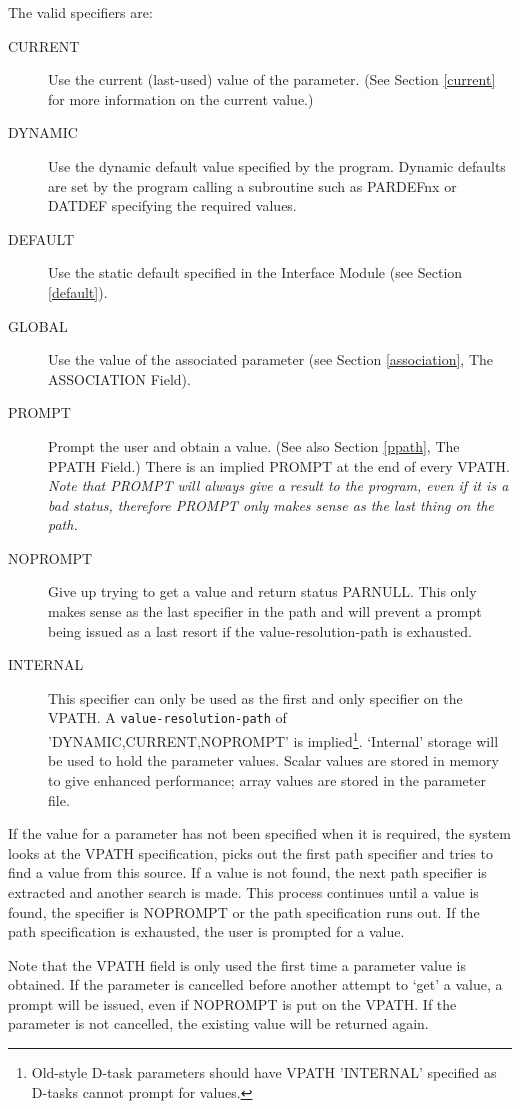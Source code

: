 \documentclass[twoside,11pt]{article}
\renewcommand{\_}{\texttt{\symbol{95}}}
\begin{document}
The valid specifiers are:
\begin{description}
\item[CURRENT] Use the current (last-used) value of the parameter.
(See Section \ref{current} for more information on the current value.)
\item[DYNAMIC] Use the dynamic default value specified by the program.
Dynamic defaults are set by the program calling a subroutine such as
PAR\_DEFnx or DAT\_DEF specifying the required values.
\item[DEFAULT] Use the static default specified in the Interface Module
(see Section \ref{default}).
\item[GLOBAL] Use the value of the associated parameter (see Section
\ref{association}, The ASSOCIATION Field).
\item[PROMPT]  Prompt the user and obtain a value. (See also Section
\ref{ppath}, The PPATH Field.)
There is an implied PROMPT at the end of every VPATH.
{\em Note that PROMPT will always give a result to the program, even if it is
a bad status, therefore PROMPT only makes sense as the last thing on the path.}
\item[NOPROMPT] Give up trying to get a value and return status PAR\_\_NULL.
This only makes sense as the last specifier in the path and will prevent a
prompt being issued as a last resort if the value-resolution-path is exhausted.
\item[INTERNAL] This specifier can only be used as the first and only
specifier on the VPATH.
A \texttt{value-resolution-path} of 'DYNAMIC,CURRENT,NOPROMPT' is
implied\footnote{Old-style D-task parameters should have VPATH 'INTERNAL'
specified as D-tasks cannot prompt for values.}.
`Internal' storage will be used to hold the parameter values.
Scalar values are stored in memory to give enhanced performance; array values
are stored in the parameter file.
\end{description}

If the value for a parameter has not been specified when it is required,
the system looks at the VPATH specification, picks out the first path
specifier and tries to find a value from this source.
If a value is not found, the next path
specifier is extracted and another search is made. This process continues
until a value is found, the specifier is NOPROMPT or the path specification
runs out.
If the path specification is exhausted, the user is prompted for a value.

Note that the VPATH field is only used the first time a parameter value is
obtained. If the parameter is cancelled before another attempt to `get' a
value, a prompt will be issued, even if NOPROMPT is put on the VPATH.
If the parameter is not cancelled, the existing value will be returned again.
\end{document}
